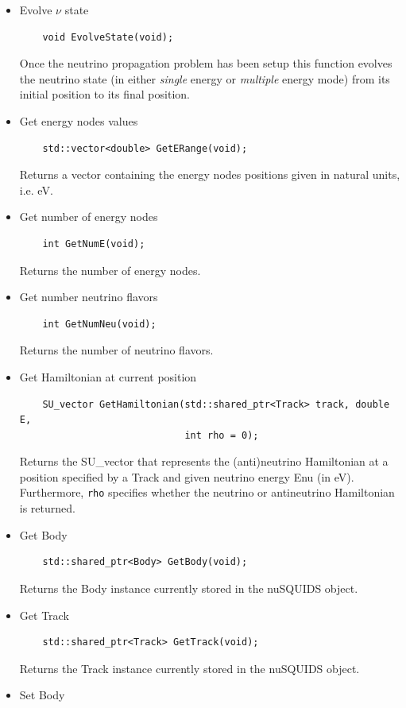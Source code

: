 \documentclass[3p,12pt,authoryear]{elsarticle}
\newcommand{\ttf}{\ttfamily}
\begin{document}
\begin{itemize}
\item Evolve $\nu$ state
  \begin{lstlisting}
    void EvolveState(void);
  \end{lstlisting}
Once the neutrino propagation problem has been setup this function evolves the neutrino state (in either {\it single} energy or {\it multiple} energy mode) from its initial position to its final position.
\item Get energy nodes values
  \begin{lstlisting}
    std::vector<double> GetERange(void);
  \end{lstlisting}
  Returns a vector containing the energy nodes positions given in natural units, i.e. eV.
  \item Get number of energy nodes
  \begin{lstlisting}
    int GetNumE(void);
  \end{lstlisting}
  Returns the number of energy nodes.
  \item Get number neutrino flavors
  \begin{lstlisting}
    int GetNumNeu(void);
  \end{lstlisting}
  Returns the number of neutrino flavors.
  \item Get Hamiltonian at current position
  \begin{lstlisting}
    SU_vector GetHamiltonian(std::shared_ptr<Track> track, double E, 
                             int rho = 0);
  \end{lstlisting}
  Returns the {\ttf SU\_vector} that represents the (anti)neutrino Hamiltonian at a position
  specified by a {\ttf Track} and given neutrino energy {\ttf Enu} (in eV). Furthermore, {\tt rho} 
  specifies whether the neutrino or antineutrino Hamiltonian is returned.
  \item Get {\ttfamily Body}
  \begin{lstlisting}
    std::shared_ptr<Body> GetBody(void);
  \end{lstlisting}
  Returns the {\ttf Body} instance currently stored in the {\ttf nuSQUIDS} object.
  \item Get {\ttfamily Track}
  \begin{lstlisting}
    std::shared_ptr<Track> GetTrack(void);
  \end{lstlisting}
  Returns the {\ttf Track} instance currently stored in the {\ttf nuSQUIDS} object.
  \item Set {\ttfamily Body}
  \begin{lstlisting}

\end{lstlisting}
\end{itemize}
\end{document}
